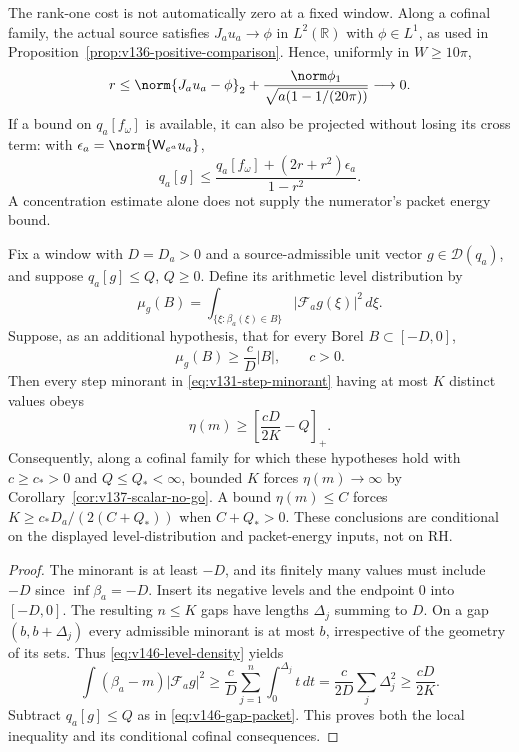 The rank-one cost is not automatically zero at a fixed window. Along
a cofinal family, the actual source satisfies $J_au_a\to\phi$ in
$L^2(\mathbb R)$ with $\phi\in L^1$, as used in
Proposition~\ref{prop:v136-positive-comparison}. Hence, uniformly in
$W\ge10\pi$,
\[
 r\le\norm{J_au_a-\phi}_2
       +\frac{\norm\phi_1}{\sqrt{a(1-1/(20\pi))}}\longrightarrow0.
\]
If a bound on $q_a[f_\omega]$ is available, it can also be projected
without losing its cross term: with
$\epsilon_a=\norm{\mathsf W_{e^a}u_a}$,
\[
 q_a[g]\le\frac{q_a[f_\omega]+(2r+r^2)\epsilon_a}{1-r^2}.
\]
A concentration estimate alone does not supply the numerator's packet
energy bound.

\begin{proposition}
\label{prop:v146-level-complexity}
Fix a window with $D=D_a>0$ and a source-admissible unit vector
$g\in\mathcal D(q_a)$, and suppose $q_a[g]\le Q$, $Q\ge0$.
Define its arithmetic level distribution by
\[
 \mu_g(B)=\int_{\{\xi:\beta_a(\xi)\in B\}}
                      |\mathcal F_ag(\xi)|^2\,d\xi.
\]
Suppose, as an additional hypothesis, that for every Borel
$B\subset[-D,0]$,
\begin{equation}\label{eq:v146-level-density}
 \mu_g(B)\ge\frac{c}{D}|B|,\qquad c>0.
\end{equation}
Then every step minorant in \eqref{eq:v131-step-minorant} having at
most $K$ distinct values obeys
\begin{equation}\label{eq:v146-level-lower}
 \eta(m)\ge\left[\frac{cD}{2K}-Q\right]_+.
\end{equation}
Consequently, along a cofinal family for which these hypotheses hold
with $c\ge c_*>0$ and $Q\le Q_*<\infty$, bounded $K$ forces
$\eta(m)\to\infty$ by Corollary~\ref{cor:v137-scalar-no-go}.
A bound $\eta(m)\le C$ forces
$K\ge c_*D_a/(2(C+Q_*))$ when $C+Q_*>0$.
These conclusions are conditional on the displayed level-distribution
and packet-energy inputs, not on RH.
\end{proposition}
\begin{proof}
The minorant is at least $-D$, and its finitely many values must include
$-D$ since $\inf\beta_a=-D$. Insert its negative levels and the endpoint
$0$ into $[-D,0]$. The resulting $n\le K$ gaps have lengths
$\Delta_j$ summing to $D$. On a gap $(b,b+\Delta_j)$ every admissible
minorant is at most $b$, irrespective of the geometry of its sets.
Thus \eqref{eq:v146-level-density} yields
\[
 \int(\beta_a-m)|\mathcal F_ag|^2
 \ge\frac{c}{D}\sum_{j=1}^n\int_0^{\Delta_j}t\,dt
 =\frac{c}{2D}\sum_j\Delta_j^2\ge\frac{cD}{2K}.
\]
Subtract $q_a[g]\le Q$ as in \eqref{eq:v146-gap-packet}. This proves
both the local inequality and its conditional cofinal consequences.
\end{proof}


